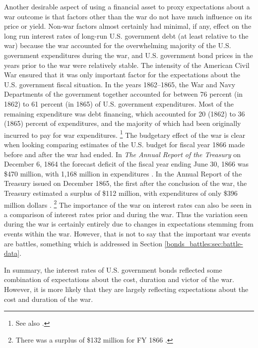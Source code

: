 Another desirable aspect of using a financial asset to proxy expectations about a war outcome is that factors other than the war do not have much influence on its price or yield.
Non-war factors almost certainly had minimal, if any, effect on the long run interest rates of long-run U.S. government debt (at least relative to the war) because the war accounted for the overwhelming majority of the U.S. government expenditures during the war, and U.S. government bond prices in the years prior to the war were relatively stable.
The intensity of the American Civil War ensured that it was only important factor for the expectations about the U.S. government fiscal situation.
In the years 1862--1865, the War and Navy Departments of the government together accounted for between 76 percent (in 1862) to 61 percent (in 1865) of U.S. government expenditures.
Most of the remaining expenditure was debt financing, which accounted for 20 (1862) to 36 (1865) percent of expenditures, and the majority of which had been originally incurred to pay for war expenditures.%
\footnote{See also \textcite[][14]{Godfrey1976}.}
The budgetary effect of the war is clear when looking comparing estimates of the U.S. budget for fiscal year 1866 made before and after the war had ended.
In \textit{The Annual Report of the  Treasury} on December 6, 1864 the forecast deficit of the fiscal year ending June 30, 1866 was \$470 million, with 1,168 million in expenditures \parencite[13][]{Treasury1864}.
In the Annual Report of the Treasury issued on December 1865, the first after the conclusion of the war, the Treasury estimated a surplus of \$112 million, with expenditures of only \$396 million dollars \parencite{Treasury1865}.%
\footnote{There was a surplus of \$132 million for FY 1866 \parencite[2][]{Treasury1866}.}
The importance of the war on interest rates can also be seen in a comparison of interest rates prior and during the war.
Thus the variation seen during the war is certainly entirely due to changes in expectations stemming from events within the war.
However, that is not to say that the important war events are battles, something which is addressed in Section \ref{bonds_battles:sec:battle-data}.

In summary, the interest rates of U.S. government bonds reflected some combination of expectations about the cost, duration and victor of the war.
However, it is more likely that they are largely reflecting expectations about the cost and duration of the war.

